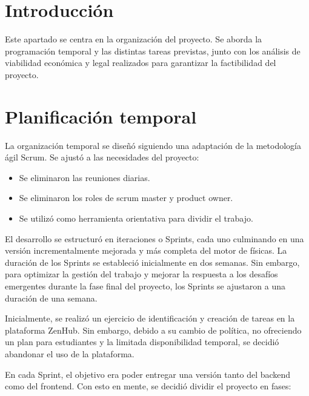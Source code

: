 
\section{Introducción}
Este apartado se centra en la organización del proyecto. Se aborda la programación temporal y las distintas tareas previstas, junto con los análisis de viabilidad económica y legal realizados para garantizar la factibilidad del proyecto.
\section{Planificación temporal}
La organización temporal se diseñó siguiendo una adaptación de la metodología ágil Scrum. Se ajustó a las necesidades del proyecto:
\begin{itemize}
    \item Se eliminaron las reuniones diarias.
    \item Se eliminaron los roles de scrum master y product owner.
    \item Se utilizó como herramienta orientativa para dividir el trabajo.
\end{itemize}

El desarrollo se estructuró en iteraciones o Sprints, cada uno culminando en una versión incrementalmente mejorada y más completa del motor de físicas. La duración de los Sprints se estableció inicialmente en dos semanas. Sin embargo, para optimizar la gestión del trabajo y mejorar la respuesta a los desafíos emergentes durante la fase final del proyecto, los Sprints se ajustaron a una duración de una semana.

Inicialmente, se realizó un ejercicio de identificación y creación de tareas en la plataforma ZenHub. Sin embargo, debido a su cambio de política, no ofreciendo un plan para estudiantes y la limitada disponibilidad temporal, se decidió abandonar el uso de la plataforma. 

En cada Sprint, el objetivo era poder entregar una versión tanto del backend como del frontend. Con esto en mente, se decidió dividir el proyecto en fases:

